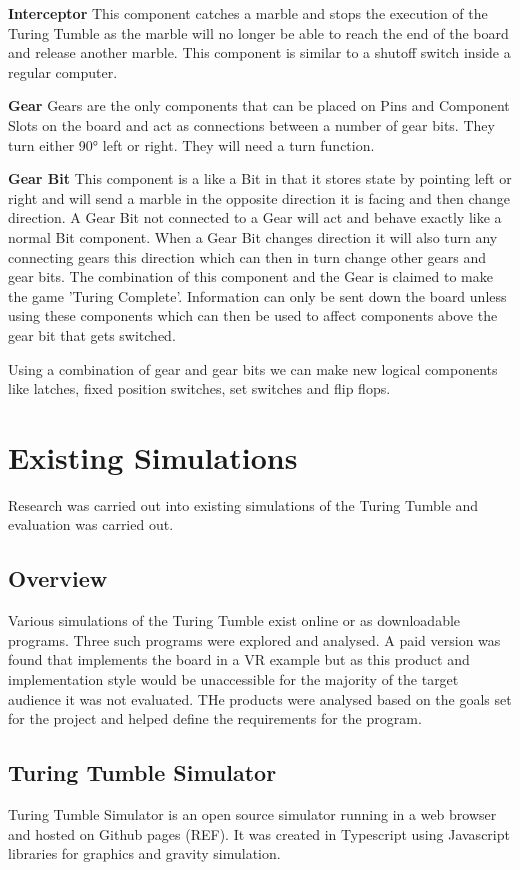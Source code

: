 \documentclass{l4proj}
\begin{document}
\textbf{Interceptor}
This component catches a marble and stops the execution of the Turing Tumble as the marble will no longer be able to reach the end of the board and release another marble. This component is similar to a shutoff switch inside a regular computer. 

\textbf{Gear}
Gears are the only components that can be placed on Pins and Component Slots on the board and act as connections between a number of gear bits. They turn either 90° left or right. They will need a turn function.

\textbf{Gear Bit}
This component is a like a Bit in that it stores state by pointing left or right and will send a marble in the opposite direction it is facing and then change direction. A Gear Bit not connected to a Gear will act and behave exactly like a normal Bit component. When a Gear Bit changes direction it will also turn any connecting gears this direction which can then in turn change other gears and gear bits. The combination of this component and the Gear is claimed to make the game 'Turing Complete'. Information can only be sent down the board unless using these components which can then be used to affect components above the gear bit that gets switched.

Using a combination of gear and gear bits we can make new logical components like latches, fixed position switches, set switches and flip flops.

\section{Existing Simulations}
Research was carried out into existing simulations of the Turing Tumble and evaluation was carried out.

\subsection{Overview}
Various simulations of the Turing Tumble exist online or as downloadable programs. Three such programs were explored and analysed. A paid version was found that implements the board in a VR example but as this product and implementation style would be unaccessible for the majority of the target audience it was not evaluated. THe products were analysed based on the goals set for the project and helped define the requirements for the program.

\subsection{Turing Tumble Simulator}
Turing Tumble Simulator is an open source simulator running in a web browser and hosted on Github pages (REF). It was created in Typescript using Javascript libraries for graphics and gravity simulation.
\end{document}
